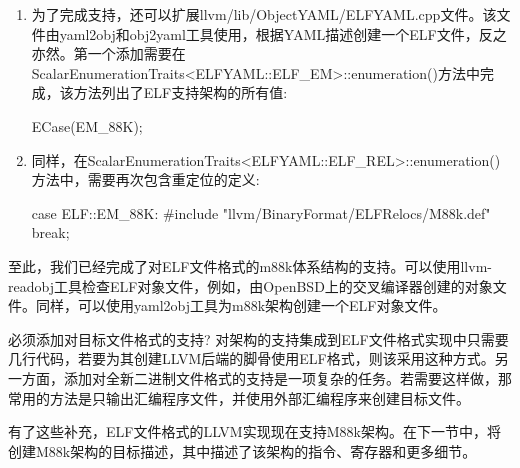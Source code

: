 \begin{enumerate}
\item
为了完成支持，还可以扩展llvm/lib/ObjectYAML/ELFYAML.cpp文件。该文件由yaml2obj和obj2yaml工具使用，根据YAML描述创建一个ELF文件，反之亦然。第一个添加需要在ScalarEnumerationTraits<ELFYAML::ELF\_EM>::enumeration()方法中完成，该方法列出了ELF支持架构的所有值:

\begin{cpp}
ECase(EM_88K);
\end{cpp}

\item
同样，在ScalarEnumerationTraits<ELFYAML::ELF\_REL>::enumeration()方法中，需要再次包含重定位的定义:

\begin{cpp}
    case ELF::EM_88K:
#include "llvm/BinaryFormat/ELFRelocs/M88k.def"
    break;
\end{cpp}
\end{enumerate}

至此，我们已经完成了对ELF文件格式的m88k体系结构的支持。可以使用llvm-readobj工具检查ELF对象文件，例如，由OpenBSD上的交叉编译器创建的对象文件。同样，可以使用yaml2obj工具为m88k架构创建一个ELF对象文件。

\begin{myNotic}{必须添加对目标文件格式的支持?}
对架构的支持集成到ELF文件格式实现中只需要几行代码，若要为其创建LLVM后端的脚骨使用ELF格式，则该采用这种方式。另一方面，添加对全新二进制文件格式的支持是一项复杂的任务。若需要这样做，那常用的方法是只输出汇编程序文件，并使用外部汇编程序来创建目标文件。
\end{myNotic}

有了这些补充，ELF文件格式的LLVM实现现在支持M88k架构。在下一节中，将创建M88k架构的目标描述，其中描述了该架构的指令、寄存器和更多细节。

















